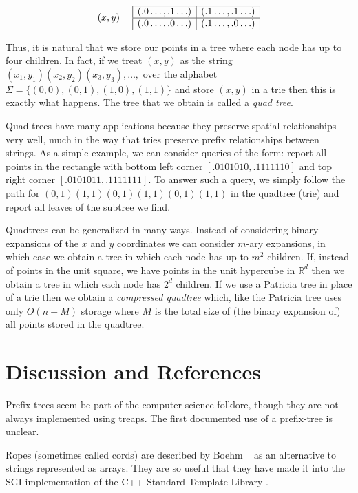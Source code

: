 \[(x,y) = \begin{array}{|c|c|}\hline
(.0\ldots,.1\ldots) & (.1\ldots,.1\ldots) \\ \hline
(.0\ldots,.0\ldots) & (.1\ldots,.0\ldots) \\ \hline
\end{array}
\]

Thus, it is natural that we store our points in a tree where each node
has up to four children.  In fact, if we treat $(x,y)$ as the string
$(x_1,y_1)(x_2,y_2)(x_3,y_3),\ldots,$ over the alphabet
$\Sigma=\{(0,0),(0,1),(1,0),(1,1)\}$ and store $(x,y)$ in a trie then
this is exactly what happens.  The tree that we obtain is called a
\emph{quad tree}.

Quad trees have many applications because they preserve spatial
relationships very well, much in the way that tries preserve prefix
relationships between strings.  As a simple example, we can consider
queries of the form: report all points in the rectangle with bottom
left corner $[.0101010,.1111110]$ and top right corner
$[.0101011,.1111111]$.  To answer such a query, we simply follow the
path for $(0,1)(1,1)(0,1)(1,1)(0,1)(1,1)$ in the quadtree (trie) and
report all leaves of the subtree we find.

Quadtrees can be generalized in many ways.  Instead of considering
binary expansions of the $x$ and $y$ coordinates we can consider
$m$-ary expansions, in which case we obtain a tree in which each node
has up to $m^2$ children.  If, instead of points in the unit square,
we have points in the unit hypercube in $\mathbb{R}^d$ then we obtain
a tree in which each node has $2^d$ children.  If we use a Patricia
tree in place of a trie then we obtain a \emph{compressed quadtree}
which, like the Patricia tree uses only $O(n+M)$ storage where $M$ is
the total size of (the binary expansion of) all points stored in the
quadtree.  

\section{Discussion and References}

Prefix-trees seem be part of the computer science folklore, though
they are not always implemented using treaps. The first documented use
of a prefix-tree is unclear.

Ropes (sometimes called cords) are described by Boehm \etal\ \cite{bap95}
as an alternative to strings represented as arrays.  They are so useful
that they have made it into the SGI implementation of the C++ Standard
Template Library \cite{x}.

